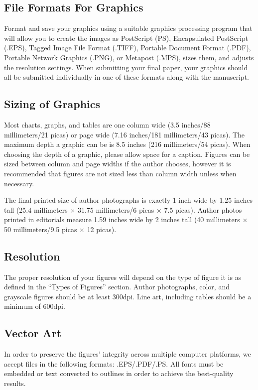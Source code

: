 \documentclass{ieeeaccess}
\begin{document}
\subsection{File Formats For Graphics}\label{formats}
Format and save your graphics using a suitable graphics processing program
that will allow you to create the images as PostScript (PS), Encapsulated
PostScript (.EPS), Tagged Image File Format (.TIFF), Portable Document
Format (.PDF), Portable Network Graphics (.PNG), or Metapost (.MPS), sizes them, and adjusts
the resolution settings. When
submitting your final paper, your graphics should all be submitted
individually in one of these formats along with the manuscript.

\subsection{Sizing of Graphics}
Most charts, graphs, and tables are one column wide (3.5 inches/88
millimeters/21 picas) or page wide (7.16 inches/181 millimeters/43
picas). The maximum depth a graphic can be is 8.5 inches (216 millimeters/54
picas). When choosing the depth of a graphic, please allow space for a
caption. Figures can be sized between column and page widths if the author
chooses, however it is recommended that figures are not sized less than
column width unless when necessary.

The final printed size of author photographs is exactly
1 inch wide by 1.25 inches tall (25.4 millimeters$\,\times\,$31.75 millimeters/6
picas$\,\times\,$7.5 picas). Author photos printed in editorials measure 1.59 inches
wide by 2 inches tall (40 millimeters$\,\times\,$50 millimeters/9.5 picas$\,\times\,$12
picas).

\subsection{Resolution }
The proper resolution of your figures will depend on the type of figure it
is as defined in the ``Types of Figures'' section. Author photographs,
color, and grayscale figures should be at least 300dpi. Line art, including
tables should be a minimum of 600dpi.

\subsection{Vector Art}
In order to preserve the figures' integrity across multiple computer
platforms, we accept files in the following formats: .EPS/.PDF/.PS. All
fonts must be embedded or text converted to outlines in order to achieve the
best-quality results.
\end{document}
